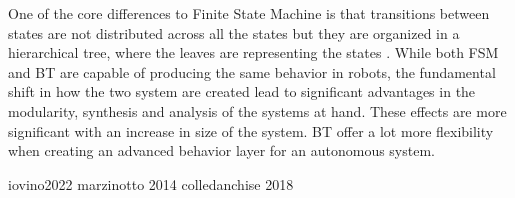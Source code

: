One of the core differences to Finite State Machine is that transitions between states are not distributed across all the states but they are organized in a hierarchical tree, where the leaves are representing the states \cite{iovino2022}. While both FSM and BT are capable of producing the same behavior in robots, the fundamental shift in how the two system are created lead to significant advantages in the modularity, synthesis and analysis of the systems at hand. These effects are more significant with an increase in size of the system. BT offer a lot more flexibility when creating an advanced behavior layer for an autonomous system. 


iovino2022
marzinotto 2014
colledanchise 2018



